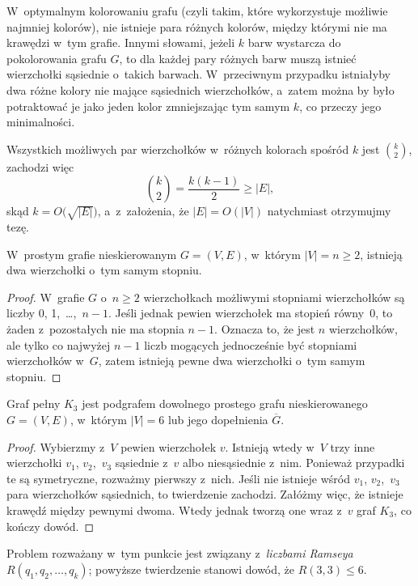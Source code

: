 \subproblem %
W~optymalnym kolorowaniu grafu (czyli takim, które wykorzystuje możliwie najmniej kolorów), nie istnieje para różnych kolorów, między którymi nie ma krawędzi w~tym grafie. Innymi słowami, jeżeli $k$ barw wystarcza do pokolorowania grafu $G$, to dla każdej pary różnych barw muszą istnieć wierzchołki sąsiednie o~takich barwach. W~przeciwnym przypadku istniałyby dwa różne kolory nie mające sąsiednich wierzchołków, a~zatem można by było potraktować je jako jeden kolor zmniejszając tym samym $k$, co przeczy jego minimalności.

Wszystkich możliwych par wierzchołków w~różnych kolorach spośród $k$ jest $\binom{k}{2}$, zachodzi więc
\[
    \binom{k}{2} = \frac{k(k-1)}{2} \ge |E|,
\]
skąd $k=O\bigl(\!\sqrt{|E|}\bigr)$, a~z~założenia, że $|E|=O(|V|)$ natychmiast otrzymujmy tezę.

\subproblem %
\begin{twierdzenie}
	W~prostym grafie nieskierowanym $G=(V,E)$, w~którym $|V|=n\ge2$, istnieją dwa wierzchołki o~tym samym stopniu.
\end{twierdzenie}
\begin{proof}
W~grafie $G$ o~$n\ge2$ wierzchołkach możliwymi stopniami wierzchołków są liczby 0, 1,~\dots,~$n-1$. Jeśli jednak pewien wierzchołek ma stopień równy~0, to żaden z~pozostałych nie ma stopnia $n-1$. Oznacza to, że jest $n$ wierzchołków, ale tylko co najwyżej $n-1$ liczb mogących jednocześnie być stopniami wierzchołków w~$G$, zatem istnieją pewne dwa wierzchołki o~tym samym stopniu.
\end{proof}

\subproblem %
\begin{twierdzenie}
	Graf pełny $K_3$ jest podgrafem dowolnego prostego grafu nieskierowanego $G=(V,E)$, w~którym $|V|=6$ lub jego dopełnienia $\overline{G}$.
\end{twierdzenie}
\begin{proof}
Wybierzmy z~$V$ pewien wierzchołek $v$. Istnieją wtedy w~$V$ trzy inne wierzchołki $v_1$, $v_2$,~$v_3$ sąsiednie z~$v$ albo niesąsiednie z~nim. Ponieważ przypadki te są symetryczne, rozważmy pierwszy z~nich. Jeśli nie istnieje wśród $v_1$, $v_2$,~$v_3$ para wierzchołków sąsiednich, to twierdzenie zachodzi. Załóżmy więc, że istnieje krawędź między pewnymi dwoma. Wtedy jednak tworzą one wraz z~$v$ graf $K_3$, co kończy dowód.
\end{proof}

Problem rozważany w~tym punkcie jest związany z~\emph{liczbami Ramseya} $R(q_1,q_2,\dots,q_k)$; powyższe twierdzenie stanowi dowód, że $R(3,3)\le6$.

